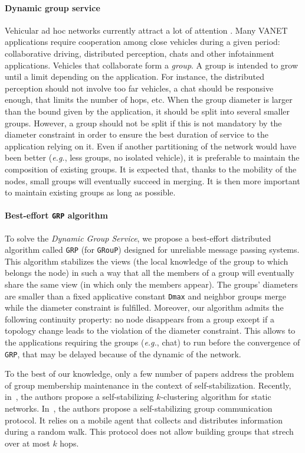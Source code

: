 \documentclass[11pt,english]{article}
\newcommand{\Latin}[1]{\textit{#1}}
\newcommand{\eg}{\Latin{e.g.},\xspace}
\begin{document}
\paragraph{Dynamic group service}
Vehicular ad hoc networks currently attract a lot of attention \cite{BEH04}.
Many VANET applications require cooperation among close vehicles during a given
period: collaborative driving, distributed perception, chats and other
infotainment applications.
Vehicles that collaborate form a \emph{group}. A group is intended to grow
until a limit depending on the application. For instance, the distributed
perception should not involve too far vehicles, a chat should be responsive
enough, that limits the number of hops, etc.
When the group diameter is larger than the bound given by the application, it
should be split into several smaller groups.
However, a group should not be split if this is not mandatory by the diameter
constraint in order to ensure the best duration of service to the application
relying on it.
Even if another partitioning of the network would have been better (\eg less
groups, no isolated vehicle), it is preferable to maintain the composition of
existing groups. It is expected that, thanks to the mobility of the nodes, small
groups will eventually succeed in merging. It is then more important to 
maintain existing groups as long as possible.

\paragraph{Best-effort \texttt{GRP} algorithm}
To solve the \emph{Dynamic Group Service}, we propose a best-effort distributed
algorithm called \texttt{GRP} (for \texttt{GRouP}) designed for unreliable
message passing systems.
This algorithm stabilizes the views (the local knowledge of the group to which
belongs the node) in such a way that all the members of a group will eventually
share the same view (in which only the members appear). The groups' diameters
are smaller than a fixed applicative constant \texttt{Dmax} and neighbor groups
merge while the diameter constraint is fulfilled. Moreover, our algorithm admits
the following continuity property: no node disappears from a group except if a
topology change leads to the violation of the diameter constraint.
This allows to the applications requiring the groups (\eg chat) to run before
the convergence of \texttt{GRP}, that may be delayed because of the dynamic of
the network.

To the best of our knowledge, only a few number of papers address the problem
of group membership maintenance in the context of self-stabilization.  Recently,
in~\cite{DLV08}, the authors propose a self-stabilizing $k$-clustering algorithm
for static networks.  In~\cite{TMC06}, the authors propose a self-stabilizing
group communication protocol.  It relies on a mobile agent that collects and
distributes information during a random walk.  This protocol does not allow 
building groups that strech over at most $k$ hops.
\end{document}
